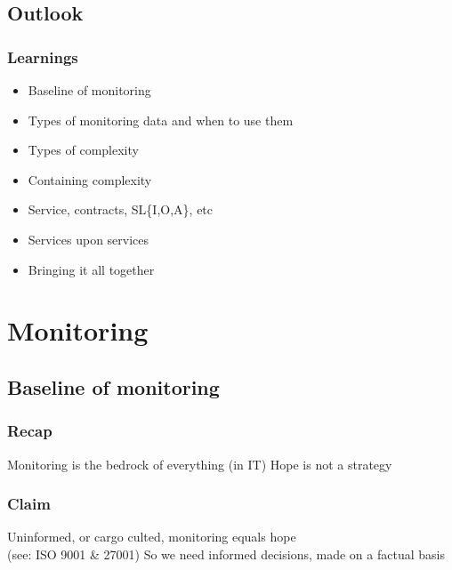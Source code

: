 \documentclass[t]{beamer}
\begin{document}
\subsection{Outlook}

\begin{frame}
	\frametitle{Learnings}
	\vfill
	\begin{itemize}

		\item Baseline of monitoring
		\item Types of monitoring data and when to use them

		\item Types of complexity
		\item Containing complexity

		\item Service, contracts, SL\{I,O,A\}, etc
		\item Services upon services

		\item Bringing it all together
	\end{itemize}
	\vfill
\end{frame}



\section{Monitoring}


\subsection{Baseline of monitoring}

\begin{frame}
	\frametitle{Recap}
	\begin{center}
		\vfill
		Monitoring is the bedrock of everything (in IT)
		\vfill
		Hope is not a strategy
		\vfill
	\end{center}
\end{frame}

\begin{frame}
	\frametitle{Claim}
	\begin{center}
		\vfill
		Uninformed, or cargo culted, monitoring equals hope\\
		(see: ISO 9001 \& 27001)
		\vfill
		So we need informed decisions, made on a factual basis
		\vfill
	\end{center}
\end{frame}
\end{document}
